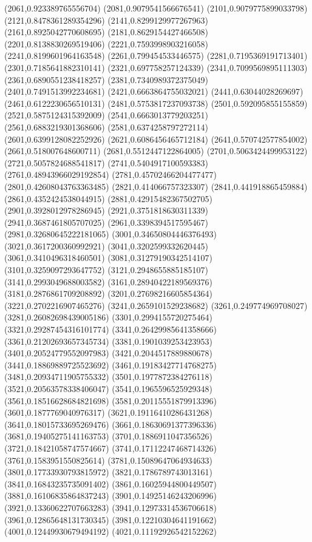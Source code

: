 {(2061,0.923389765556704)
(2081,0.9079541566676541)
(2101,0.9079775899033798)
(2121,0.8478361289354296)
(2141,0.8299129977267963)
(2161,0.8925042770608695)
(2181,0.8629154427466508)
(2201,0.8138830269519406)
(2221,0.7593998903216058)
(2241,0.8199601964163548)
(2261,0.799454533446575)
(2281,0.7195369191713401)
(2301,0.7185641882310141)
(2321,0.697758257124339)
(2341,0.7099569895111303)
(2361,0.6890551238418257)
(2381,0.7340989372375049)
(2401,0.7491513992234681)
(2421,0.6663864755032021)
(2441,0.63044028269697)
(2461,0.6122230656510131)
(2481,0.5753817237093738)
(2501,0.592095855155859)
(2521,0.5875124315392009)
(2541,0.6663013779203251)
(2561,0.6883219301368606)
(2581,0.6374258797272114)
(2601,0.6399128082252926)
(2621,0.6086456465712184)
(2641,0.570742577854002)
(2661,0.518007648600711)
(2681,0.5512447122864005)
(2701,0.5063424499953122)
(2721,0.5057824688541817)
(2741,0.5404917100593383)
(2761,0.48943966029192854)
(2781,0.45702466204477477)
(2801,0.42608043763363485)
(2821,0.414066757323307)
(2841,0.441918865459884)
(2861,0.4352424538044915)
(2881,0.42915482367502705)
(2901,0.3928012978286945)
(2921,0.3751818630311339)
(2941,0.3687461805707025)
(2961,0.3398394517595467)
(2981,0.32680645222181065)
(3001,0.34650804446376493)
(3021,0.3617200360992921)
(3041,0.3202599332620445)
(3061,0.3410496318460501)
(3081,0.31279190342514107)
(3101,0.3259097293647752)
(3121,0.2948655885185107)
(3141,0.2993049688003582)
(3161,0.28940422189569376)
(3181,0.2876861709208892)
(3201,0.27698216605854364)
(3221,0.2702216907465276)
(3241,0.2659101529238682)
(3261,0.249774969708027)
(3281,0.26082698439005186)
(3301,0.2994155720275464)
(3321,0.29287454316101774)
(3341,0.26429985641358666)
(3361,0.21202693657345734)
(3381,0.1901039253423953)
(3401,0.20524779552097983)
(3421,0.2044517889880678)
(3441,0.18869889725523692)
(3461,0.19183427714768275)
(3481,0.20934711905755332)
(3501,0.1977872384276118)
(3521,0.20563578338406047)
(3541,0.1965596525929348)
(3561,0.18516628684821698)
(3581,0.20115551879913396)
(3601,0.1877769040976317)
(3621,0.19116410286431268)
(3641,0.18015733695269476)
(3661,0.18630691377396336)
(3681,0.19405275141163753)
(3701,0.1886911047356526)
(3721,0.18421058747574667)
(3741,0.17112247468714326)
(3761,0.1583951550825614)
(3781,0.15089647064934633)
(3801,0.17733930793815972)
(3821,0.1786789743013161)
(3841,0.16843235735091402)
(3861,0.16025944800449507)
(3881,0.16106835864837243)
(3901,0.14925146243206996)
(3921,0.13360622707663283)
(3941,0.12973314536706618)
(3961,0.12865648131730345)
(3981,0.12210304641191662)
(4001,0.12449930679494192)
(4021,0.11192926542152262)
}
